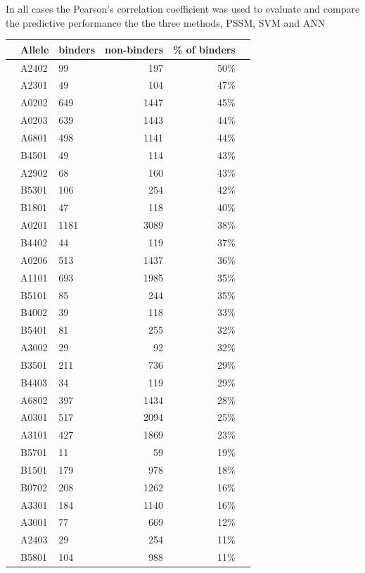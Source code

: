 
In all cases the Pearson's correlation coefficient was used to evaluate and compare the predictive performance the the three methods, PSSM\cite{PSSM}, SVM\cite{SVM} and ANN\cite{ANNf}\cite{ANNb}

\begin{table}[ht]\scriptsize
\begin{center}
\begin{tabular}{rllrrr}
\hline
 & Allele	&	 binders & non-binders & \% of binders \\
\hline
 & A2402	&	99	&	197	&	50\%	\\
 & A2301	&	49	&	104	&	47\%	\\
 & A0202	&	649	&	1447	&	45\%	\\
 & A0203	&	639	&	1443	&	44\%	\\
 & A6801	&	498	&	1141	&	44\%	\\
 & B4501	&	49	&	114	&	43\%	\\
 & A2902	&	68	&	160	&	43\%	\\
 & B5301	&	106	&	254	&	42\%	\\
 & B1801	&	47	&	118	&	40\%	\\
 & A0201	&	1181	&	3089	&	38\%	\\
 & B4402	&	44	&	119	&	37\%	\\
 & A0206	&	513	&	1437	&	36\%	\\
 & A1101	&	693	&	1985	&	35\%	\\
 & B5101	&	85	&	244	&	35\%	\\
 & B4002	&	39	&	118	&	33\%	\\
 & B5401	&	81	&	255	&	32\%	\\
 & A3002	&	29	&	92	&	32\%	\\
 & B3501	&	211	&	736	&	29\%	\\
 & B4403	&	34	&	119	&	29\%	\\
 & A6802	&	397	&	1434	&	28\%	\\
 & A0301	&	517	&	2094	&	25\%	\\
 & A3101	&	427	&	1869	&	23\%	\\
 & B5701	&	11	&	59	&	19\%	\\
 & B1501	&	179	&	978	&	18\%	\\
 & B0702	&	208	&	1262	&	16\%	\\
 & A3301	&	184	&	1140	&	16\%	\\
 & A3001	&	77	&	669	&	12\%	\\
 & A2403	&	29	&	254	&	11\%	\\
 & B5801	&	104	&	988	&	11\%	\\

\end{tabular}
\end{center}
\end{table}
